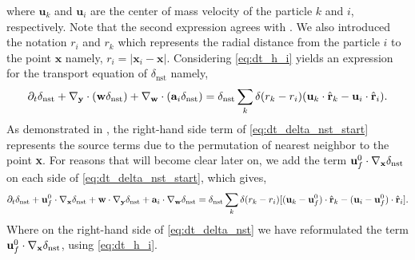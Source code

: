 where $\textbf{u}_k$ and $\textbf{u}_i$  are the center of mass velocity of the particle $k$ and $i$, respectively.
Note that the second expression agrees with \citet[Appendix A]{zhang2021ensemble}. 
We also introduced the notation $r_i$ and $r_k$ which represents the radial distance from the particle $i$ to the point $\textbf{x}$ namely, $r_i = |\textbf{x}_i - \textbf{x}|$.  
Considering \ref{eq:dt_h_i}  yields an expression for the transport equation of $\delta_\text{nst}$ namely,
\begin{equation}
    \pddt \delta_\text{nst}
    + \pddy \cdot (\textbf{w} \delta_\text{nst})
    + \pddw \cdot (\textbf{a}_i  \delta_\text{nst})
    = 
    \delta_\text{nst}
    \sum_k 
    \delta(r_k - r_i)
    (\textbf{u}_k  \cdot \hat{\textbf{r}}_k - \textbf{u}_i  \cdot \hat{\textbf{r}}_i). 
    \label{eq:dt_delta_nst_start}
\end{equation}
As demonstrated in \citet{zhang2023evolution}, the right-hand side term of \ref{eq:dt_delta_nst_start} represents the source terms due to the permutation of nearest neighbor to the point \textbf{x}. 
For reasons that will become clear later on, we add the term $\textbf{u}_f^0\cdot {\mathbf{\nabla}_\textbf{x}} \delta_\text{nst}$ on each side of \ref{eq:dt_delta_nst_start}, which gives,
\begin{equation}
    \pddt \delta_\text{nst}
    + \textbf{u}_f^0\cdot \pddx \delta_\text{nst}
    + \textbf{w}   \cdot \pddy \delta_\text{nst}
    + \textbf{a}_i \cdot \pddw   \delta_\text{nst}
    = 
    \delta_\text{nst}
    \sum_k 
    \delta(r_k - r_i)
    [(\textbf{u}_k - \textbf{u}_f^0) \cdot \hat{\textbf{r}}_k - (\textbf{u}_i  - \textbf{u}_f^0)\cdot \hat{\textbf{r}}_i]. 
    \label{eq:dt_delta_nst}
\end{equation}
Where on the right-hand side of \ref{eq:dt_delta_nst} we have reformulated the term $\textbf{u}_f^0\cdot {\mathbf{\nabla}_\textbf{x}} \delta_\text{nst}$, using \ref{eq:dt_h_i}. 

